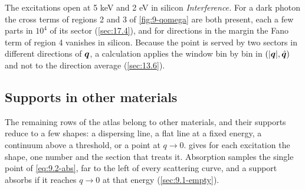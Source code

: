 \begin{workedexample}{The excitations open at 5 keV and 2 eV in silicon}
\emph{Interference.} For a dark photon the cross terms of regions 2 and 3 of \cref{fig:9-qomega} are both present, each a few parts in $10^4$ of its sector (\cref{sec:17.4}), and for directions in the margin the Fano term of region 4 vanishes in silicon. Because the point is served by two sectors in different directions of $\bm{q}$, a calculation applies the window bin by bin in $(|\bm{q}|,\hat{\bm{q}})$ and not to the direction average (\cref{sec:13.6}).
\end{workedexample}

\subsection{Supports in other materials}\label{sec:9.3-others}

The remaining rows of the atlas belong to other materials, and their supports reduce to a few shapes: a dispersing line, a flat line at a fixed energy, a continuum above a threshold, or a point at $q \to 0$.  gives for each excitation the shape, one number and the section that treats it. Absorption samples the single point of \cref{eq:9.2-abs}, far to the left of every scattering curve, and a support absorbs if it reaches $q \to 0$ at that energy (\cref{sec:9.1-empty}).

